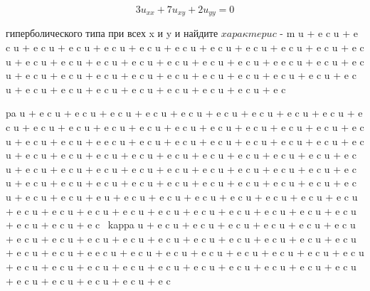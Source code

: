 \documentclass[
  ukrainian,
]{article}
\begin{document}
\[
3u_{xx} + 7u_{xy} + 2u_{yy} = 0
\]

гиперболического типа при всех x и y и найдите
\(x a p a \kappa m e p u c\) - m u + e c \kappa u + e c \kappa u + e c
\kappa u + e c \kappa u + e c \kappa u + e c \kappa u + e c \kappa u + e
c \kappa u + e c \kappa u + e c \kappa u + e c \kappa u + e c \kappa u +
e c \kappa u + e c \kappa u + e c \kappa u + e c \kappa u + e c \kappa u
+ e c \kappa u + e c \kappa u + e e c \kappa u + e c \kappa u + e c
\kappa u + e c \kappa u + e c \kappa u + e c \kappa u + e c \kappa u + e
c \kappa u + e c \kappa u + e c \kappa u + e c \kappa u + e c \kappa u +
e c \kappa u + e c \kappa u + e c \kappa u + e c \kappa u + e c \kappa u
+ e c \kappa u + e c \kappa u + e c \kap u + e c \kap

pa u + e c \kappa u + e c \kappa u + e c \kappa u + e c \kappa u + e c
\kappa u + e c \kappa u + e c \kappa u + e c \kappa u + e c \kappa u + e
c \kappa u + e c \kappa u + e c \kappa u + e c \kappa u + e c \kappa u +
e c \kappa u + e c \kappa u + e c \kappa u + e c \kappa u + e c \kappa u
+ e c \kappa u + e c \kappa u + e c \kappa u + e e c \kappa u + e c
\kappa u + e c \kappa u + e c \kappa u + e c \kappa u + e c \kappa u + e
c \kappa u + e c \kappa u + e c \kappa u + e c \kappa u + e c \kappa u +
e c \kappa u + e c \kappa u + e c \kappa u + e c \kappa u + e c \kappa u
+ e c \kappa u + e c \kappa u + e c \kappa u + e c \kappa u + e c
\kappa u + e c \kappa u + e c \kappa u + e c \kappa u + e c \kappa u + e
c \kappa u + e c \kappa u + e c \kappa u + e c \kappa u + e c \kappa u +
e c \kappa u + e c \kappa u + e c \kappa u + e c \kappa u + e c \kappa u
+ e c \kappa u + e c \kappa u + e c \kappa u + e c \kappa u + e c
\kappa u + e u + e c \kappa u + e c \kappa u + e c \kappa u + e c
\kappa u + e c \kappa u + e c \kappa u + e c \kappa u + e c \kappa u + e
c \kappa u + e c \kappa u + e c \kappa u + e c \kappa u + e c \kappa u +
e c \kappa u + e c \kappa u + e c \kappa u + e c \kappa u + e c \kappa u
+ e c \kappa u + e c ~kappa u + e c \kappa u + e c \kappa u + e c
\kappa u + e c \kappa u + e c \kappa u + e c \kappa u + e c \kappa u + e
c \kappa u + e c \kappa u + e c \kappa u + e c \kappa u + e c \kappa u +
e c \kappa u + e c \kappa u + e c \kappa u + e c \kappa u + e c \kappa u
+ e c \kappa u + e e c \kappa u + e c \kappa u + e c \kappa u + e c
\kappa u + e c \kappa u + e c \kappa u + e c \kappa u + e c \kappa u + e
c \kappa u + e c \kappa u + e c \kappa u + e c \kappa u + e c \kappa u +
e c \kappa u + e c \kappa u + e c \kappa u + e c \kappa u + e c \kappa u
+ e c \kappa u + e c \kappa u + e c \kappa u + e c \kappa u + e c
\end{document}
